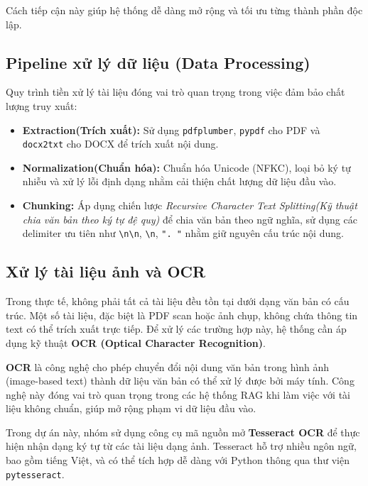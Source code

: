 ﻿\documentclass[10pt, conference, a4paper, compsocconf]{IEEEtran}
\begin{document}
Cách tiếp cận này giúp hệ thống dễ dàng mở rộng và tối ưu từng thành phần độc lập.

\subsection{Pipeline xử lý dữ liệu (Data Processing)}

Quy trình tiền xử lý tài liệu đóng vai trò quan trọng trong việc đảm bảo chất lượng truy xuất:

\begin{itemize}
    \item \textbf{Extraction(Trích xuất):} Sử dụng \texttt{pdfplumber}, \texttt{pypdf} cho PDF và \texttt{docx2txt} cho DOCX để trích xuất nội dung.
    
    \item \textbf{Normalization(Chuẩn hóa):} Chuẩn hóa Unicode (NFKC), loại bỏ ký tự nhiễu và xử lý lỗi định dạng nhằm cải thiện chất lượng dữ liệu đầu vào.
    
    \item \textbf{Chunking:} Áp dụng chiến lược \textit{Recursive Character Text Splitting(Kỹ thuật chia văn bản theo ký tự đệ quy)} để chia văn bản theo ngữ nghĩa, sử dụng các delimiter ưu tiên như \texttt{\textbackslash n\textbackslash n}, \texttt{\textbackslash n}, \texttt{". "} nhằm giữ nguyên cấu trúc nội dung.
\end{itemize}
\subsection{Xử lý tài liệu ảnh và OCR}

Trong thực tế, không phải tất cả tài liệu đều tồn tại dưới dạng văn bản có cấu trúc. Một số tài liệu, đặc biệt là PDF scan hoặc ảnh chụp, không chứa thông tin text có thể trích xuất trực tiếp. Để xử lý các trường hợp này, hệ thống cần áp dụng kỹ thuật \textbf{OCR (Optical Character Recognition)}.

\textbf{OCR} là công nghệ cho phép chuyển đổi nội dung văn bản trong hình ảnh (image-based text) thành dữ liệu văn bản có thể xử lý được bởi máy tính. Công nghệ này đóng vai trò quan trọng trong các hệ thống RAG khi làm việc với tài liệu không chuẩn, giúp mở rộng phạm vi dữ liệu đầu vào.

Trong dự án này, nhóm sử dụng công cụ mã nguồn mở \textbf{Tesseract OCR} để thực hiện nhận dạng ký tự từ các tài liệu dạng ảnh. Tesseract hỗ trợ nhiều ngôn ngữ, bao gồm tiếng Việt, và có thể tích hợp dễ dàng với Python thông qua thư viện \texttt{pytesseract}.
\end{document}
